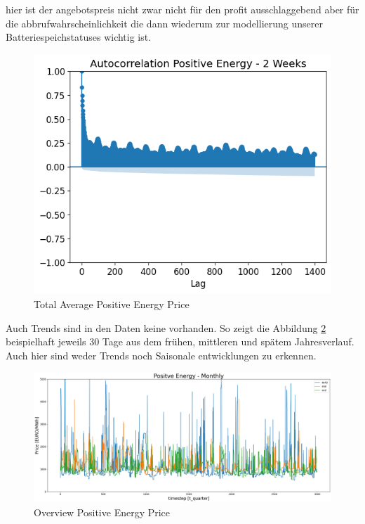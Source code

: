 hier ist der angebotspreis nicht zwar nicht für den profit ausschlaggebend aber für die abbrufwahrscheinlichkeit
die dann wiederum zur modellierung unserer Batteriespeichstatuses wichtig ist.
\begin{figure}[!h]
	\includegraphics[width=1\linewidth]{pictures/Autocorrelation Positive Energy - 2 Weeks.png}
	\caption{Total Average Positive Energy Price}
	\label{fig:Autocorrelation Positive Energy Price}
\end{figure}

Auch Trends sind in den Daten keine vorhanden. So zeigt die Abbildung \ref{fig:posEngOverview} beispielhaft jeweils 30 Tage aus dem frühen, mittleren und spätem Jahresverlauf.
Auch hier sind weder Trends noch Saisonale entwicklungen zu erkennen.

\begin{figure}[!h]
	\includegraphics[width=1\linewidth]{pictures/posEngOverview.png}
	\caption{Overview Positive Energy Price}
	\label{fig:posEngOverview}
\end{figure}

